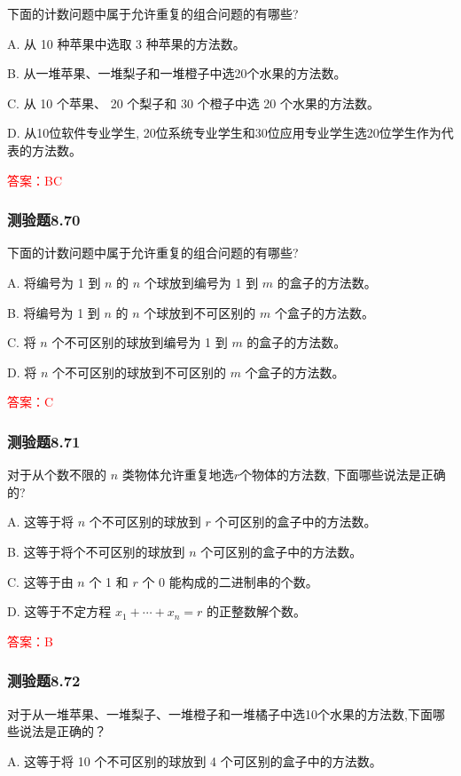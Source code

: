 \documentclass[UTF8, heading=true]{ctexart}
\begin{document}
下面的计数问题中属于允许重复的组合问题的有哪些?

A. 从 10 种苹果中选取 3 种苹果的方法数。

B. 从一堆苹果、一堆梨子和一堆橙子中选20个水果的方法数。

C. 从 10 个苹果、 20 个梨子和 30 个橙子中选 20 个水果的方法数。

D. 从10位软件专业学生, 20位系统专业学生和30位应用专业学生选20位学生作为代表的方法数。

\textcolor{red}{答案：BC}


\subsubsection{测验题8.70}

下面的计数问题中属于允许重复的组合问题的有哪些?

A. 将编号为 1 到 $n$ 的 $n$ 个球放到编号为 1 到 $m$ 的盒子的方法数。

B. 将编号为 1 到 $n$ 的 $n$ 个球放到不可区别的 $m$ 个盒子的方法数。

C. 将 $n$ 个不可区别的球放到编号为 1 到 $m$ 的盒子的方法数。

D. 将 $n$ 个不可区别的球放到不可区别的 $m$ 个盒子的方法数。

\textcolor{red}{答案：C}

\subsubsection{测验题8.71}

对于从个数不限的 $n$ 类物体允许重复地选$r$个物体的方法数, 下面哪些说法是正确的?

A. 这等于将 $n$ 个不可区别的球放到 $r$ 个可区别的盒子中的方法数。

B. 这等于将个不可区别的球放到 $n$ 个可区别的盒子中的方法数。

C. 这等于由 $n$ 个 1 和 $r$ 个 0 能构成的二进制串的个数。

D. 这等于不定方程 $x_1+\cdots+x_n=r$ 的正整数解个数。

\textcolor{red}{答案：B}

\subsubsection{测验题8.72}

对于从一堆苹果、一堆梨子、一堆橙子和一堆橘子中选10个水果的方法数,下面哪些说法是正确的？

A. 这等于将 10 个不可区别的球放到 4 个可区别的盒子中的方法数。
\end{document}
